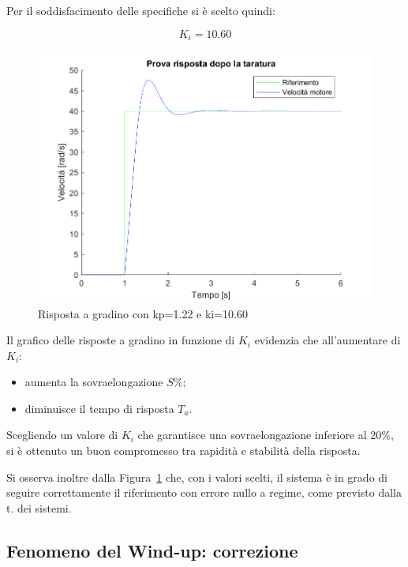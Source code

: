 \documentclass[a4paper,12pt]{article}
\begin{document}
Per il soddisfacimento delle specifiche si è scelto quindi:

\[
    K_i = 10.60
\]

\begin{figure}[h!]
    \centering
    \includegraphics[scale=0.6]{Immagini/PlotMatlab/rispostaGradinoDopoTaratura.png}
    \caption{Risposta a gradino con kp=1.22 e ki=10.60}
    \label{fig:kiscelto}
\end{figure}

\vspace{0.5cm}

Il grafico delle risposte a gradino in funzione di $K_i$ evidenzia che all’aumentare di $K_i$:
\begin{itemize}
    \item aumenta la sovraelongazione $S\%$;
    \item diminuisce il tempo di risposta $T_a$.
\end{itemize}

Scegliendo un valore di $K_i$ che garantisce una sovraelongazione inferiore al 20\%, si è ottenuto un buon compromesso tra rapidità e stabilità della risposta.


\vspace{0.5cm}
Si osserva inoltre dalla Figura~\ref{fig:kiscelto} che, con i valori scelti, il sistema è in grado di seguire correttamente il riferimento con errore nullo a regime, come previsto dalla t. dei sistemi.


\subsection{Fenomeno del Wind-up: correzione}
\end{document}
